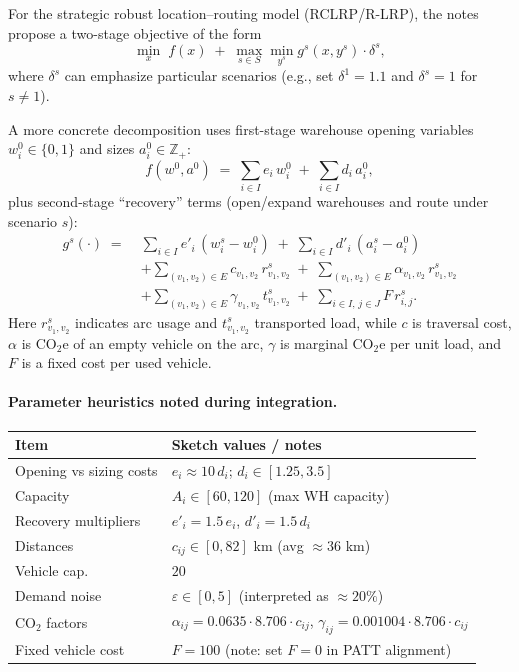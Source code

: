 \documentclass[11pt,a4paper]{article}
\begin{document}
For the strategic robust location--routing model (RCLRP/R-LRP), the notes propose a two-stage objective of the form
\begin{equation}
  \min_{x} \; f(x) \;+\; \max_{s\in S} \min_{y^s} g^s(x,y^s)\cdot \delta^s,
  \label{eq:two-stage-sketch}
\end{equation}
where $\delta^s$ can emphasize particular scenarios (e.g., set $\delta^{1}=1.1$ and $\delta^{s}=1$ for $s\neq 1$).

A more concrete decomposition uses first-stage warehouse opening variables $w_i^0\in\{0,1\}$ and sizes $a_i^0\in\mathbb{Z}_+$:
\begin{equation}
  f(w^0,a^0) \;=\; \sum_{i\in I} e_i\, w_i^0 \;+\; \sum_{i\in I} d_i\, a_i^0,
  \label{eq:rlrp-firststage}
\end{equation}
plus second-stage ``recovery'' terms (open/expand warehouses and route under scenario $s$):
\begin{align}
  g^s(\cdot) \;=\;
  &\sum_{i\in I} e'_i\,(w_i^s-w_i^0)
  \;+\; \sum_{i\in I} d'_i\,(a_i^s-a_i^0) \nonumber\\
  &+ \sum_{(v_1,v_2)\in E} c_{v_1,v_2}\, r^s_{v_1,v_2}
  \;+\; \sum_{(v_1,v_2)\in E} \alpha_{v_1,v_2}\, r^s_{v_1,v_2} \nonumber\\
  &+ \sum_{(v_1,v_2)\in E} \gamma_{v_1,v_2}\, t^s_{v_1,v_2}
  \;+\; \sum_{i\in I,\,j\in J} F\, r^s_{i,j}.
  \label{eq:rlrp-secondstage}
\end{align}
Here $r^s_{v_1,v_2}$ indicates arc usage and $t^s_{v_1,v_2}$ transported load, while $c$ is traversal cost,
$\alpha$ is CO$_2$e of an empty vehicle on the arc, $\gamma$ is marginal CO$_2$e per unit load, and $F$ is a fixed cost per used vehicle.

\paragraph{Parameter heuristics noted during integration.}
\begin{center}
\begin{tabular}{@{}ll@{}}
\toprule
Item & Sketch values / notes \\
\midrule
Opening vs sizing costs & $e_i \approx 10\, d_i$; $d_i\in[1.25,3.5]$ \\
Capacity & $A_i \in [60,120]$ (max WH capacity) \\
Recovery multipliers & $e'_i = 1.5\,e_i$, $d'_i = 1.5\,d_i$ \\
Distances & $c_{ij}\in[0,82]$ km (avg $\approx 36$ km) \\
Vehicle cap. & $20$ \\
Demand noise & $\varepsilon \in [0,5]$ (interpreted as $\approx 20\%$) \\
CO$_2$ factors & $\alpha_{ij} = 0.0635\cdot 8.706\cdot c_{ij}$,\quad
$\gamma_{ij} = 0.001004\cdot 8.706\cdot c_{ij}$ \\
Fixed vehicle cost & $F=100$ (note: set $F=0$ in PATT alignment) \\
\bottomrule
\end{tabular}
\end{center}
\end{document}
